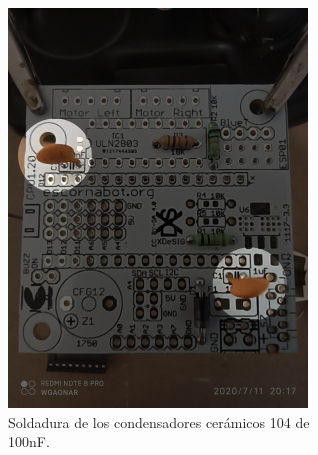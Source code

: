 \documentclass{article}
\begin{document}
\begin{figure}[H]
\begin{subfigure}[t]{0.3\textwidth}
        \includegraphics[width=0.9\columnwidth, height=1.2\columnwidth]{images/CPU/cpu_condensadores_1.png}
        \caption{Soldadura de los condensadores cerámicos 104 de 100nF.}
        \label{fig:cpu_codensadores_1}
    \end{subfigure}%
    \begin{subfigure}[t]{0.3\textwidth}
        \centering

\end{subfigure}
\end{figure}
\end{document}
